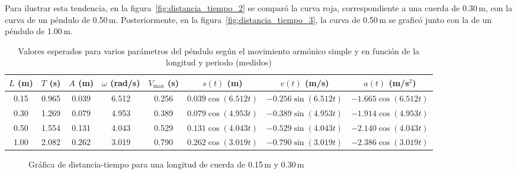 \documentclass[letterpaper]{report}
\numberwithin{table}{section}
\begin{document}
Para ilustrar esta tendencia, en la
figura~\ref{fig:distancia_tiempo_2} se comparó la curva
roja, correspondiente a una cuerda de 0.30\,m, con la curva de un
péndulo de 0.50\,m. Posteriormente, en la
figura~\ref{fig:distancia_tiempo_3}, la curva de 0.50\,m
se graficó junto con la de un péndulo de 1.00\,m.

\begin{table}[h]
  \centering
  \footnotesize
  \begin{tabular}{cccccccc}
    \toprule
    $L$ (m) & $T$ (s) & $A$ (m) & $\omega$ (rad/s) & $V_{\max}$ (s) &
    $s(t)$ (m) & $v(t)$ (m/s) & $a(t)$ (m/s$^{2}$)\\
    \midrule
    0.15 & 0.965 & 0.039 & 6.512 & 0.256 & $0.039 \cos(6.512t)$
    & $-0.256 \sin(6.512t)$ & $-1.665\cos(6.512t)$ \\
    0.30 & 1.269 & 0.079 & 4.953 & 0.389 & $0.079 \cos(4.953t)$
    & $-0.389 \sin(4.953t)$ & $-1.914\cos(4.953t)$ \\
    0.50 & 1.554 & 0.131 & 4.043 & 0.529 & $0.131 \cos(4.043t)$
    & $-0.529 \sin(4.043t)$ & $-2.140\cos(4.043t)$ \\
    1.00 & 2.082 & 0.262 & 3.019 & 0.790 & $0.262 \cos(3.019t)$
    & $-0.790 \sin(3.019t)$ & $-2.386\cos(3.019t)$ \\
    \bottomrule
  \end{tabular}
  \caption{Valores esperados para varios parámetros del péndulo según el
    movimiento armónico simple y en función de la longitud y periodo
  (medidos)}\label{tab:longitud_valores_esperados}
\end{table}

\begin{figure}[h]
  \centering
  \caption{Gráfica de distancia-tiempo para una longitud de cuerda de
  0.15\,m y 0.30\,m}\label{fig:distancia_tiempo}
\end{figure}
\end{document}
